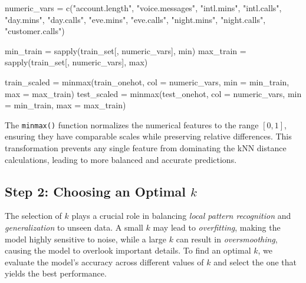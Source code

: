 \documentclass[
  11pt,
]{book}
\makeatletter
\newenvironment{Shaded}{}{}
\newcommand{\AttributeTok}[1]{#1}
\newcommand{\FunctionTok}[1]{#1}
\newcommand{\NormalTok}[1]{#1}
\newcommand{\OtherTok}[1]{\textcolor[rgb]{0.39,0.39,0.39}{#1}}
\newcommand{\StringTok}[1]{\textcolor[rgb]{0.39,0.39,0.39}{#1}}
\newenvironment{kframe}{%
\medskip{}
\setlength{\fboxsep}{.8em}
 \def\at@end@of@kframe{}%
 \ifinner\ifhmode%
  \def\at@end@of@kframe{\end{minipage}}%
  \begin{minipage}{\columnwidth}%
 \fi\fi%
 \def\FrameCommand##1{\hskip\@totalleftmargin \hskip-\fboxsep
 \colorbox{shadecolor}{##1}\hskip-\fboxsep
     \hskip-\linewidth \hskip-\@totalleftmargin \hskip\columnwidth}%
 \MakeFramed {\advance\hsize-\width
   \@totalleftmargin\z@ \linewidth\hsize
   \@setminipage}}%
 {\par\unskip\endMakeFramed%
 \at@end@of@kframe}
\renewenvironment{Shaded}{\begin{kframe}}{\end{kframe}}
\theoremstyle{definition}
\theoremstyle{definition}
\theoremstyle{definition}
\theoremstyle{definition}
\theoremstyle{remark}
\makeatother
\begin{document}
\begin{Shaded}
\begin{Highlighting}[]
\NormalTok{numeric\_vars }\OtherTok{=} \FunctionTok{c}\NormalTok{(}\StringTok{"account.length"}\NormalTok{, }\StringTok{"voice.messages"}\NormalTok{, }\StringTok{"intl.mins"}\NormalTok{, }
                 \StringTok{"intl.calls"}\NormalTok{, }\StringTok{"day.mins"}\NormalTok{, }\StringTok{"day.calls"}\NormalTok{, }\StringTok{"eve.mins"}\NormalTok{, }
                 \StringTok{"eve.calls"}\NormalTok{, }\StringTok{"night.mins"}\NormalTok{, }\StringTok{"night.calls"}\NormalTok{, }
                 \StringTok{"customer.calls"}\NormalTok{)}

\NormalTok{min\_train }\OtherTok{=} \FunctionTok{sapply}\NormalTok{(train\_set[, numeric\_vars], min)}
\NormalTok{max\_train }\OtherTok{=} \FunctionTok{sapply}\NormalTok{(train\_set[, numeric\_vars], max)}

\NormalTok{train\_scaled }\OtherTok{=} \FunctionTok{minmax}\NormalTok{(train\_onehot, }\AttributeTok{col =}\NormalTok{ numeric\_vars, }\AttributeTok{min =}\NormalTok{ min\_train, }\AttributeTok{max =}\NormalTok{ max\_train)}
\NormalTok{test\_scaled  }\OtherTok{=} \FunctionTok{minmax}\NormalTok{(test\_onehot,  }\AttributeTok{col =}\NormalTok{ numeric\_vars, }\AttributeTok{min =}\NormalTok{ min\_train, }\AttributeTok{max =}\NormalTok{ max\_train)}
\end{Highlighting}
\end{Shaded}

The \texttt{minmax()} function normalizes the numerical features to the range \([0, 1]\), ensuring they have comparable scales while preserving relative differences. This transformation prevents any single feature from dominating the kNN distance calculations, leading to more balanced and accurate predictions.

\subsection{\texorpdfstring{Step 2: Choosing an Optimal \(k\)}{Step 2: Choosing an Optimal k}}\label{step-2-choosing-an-optimal-k}

The selection of \(k\) plays a crucial role in balancing \emph{local pattern recognition} and \emph{generalization} to unseen data. A small \(k\) may lead to \emph{overfitting}, making the model highly sensitive to noise, while a large \(k\) can result in \emph{oversmoothing}, causing the model to overlook important details. To find an optimal \(k\), we evaluate the model's accuracy across different values of \(k\) and select the one that yields the best performance.
\end{document}
